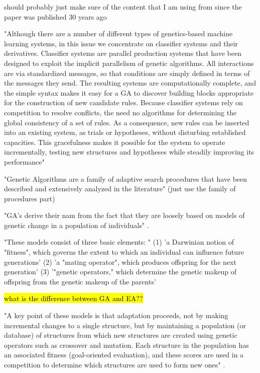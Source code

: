 should probably just make sure of the content that I am using from \cite{goldberg1988genetic} since the paper was published 30 years ago

"Although there are a number of different types of genetics-based machine learning systems, in this issue we concentrate on classifier systems and their derivatives. Classifier systems are parallel production systems that have been designed to exploit the implicit parallelism of genetic algorithms. All interactions are via standardized messages, so that conditions are simply defined in terms of the messages they send. The resulting systems are computationally complete, and the simple syntax makes it easy for a GA to discover building blocks appropriate for the construction of new candidate rules. Because classifier systems rely on competition to resolve conflicts, the need no algorithms for determining the global consistency of a set of rules. As a consequence, new rules can be inserted into an existing system, as trials or hypotheses, without disturbing established capacities. This gracefulness makes it possible for the system to operate incrementally, testing new structures and hypotheses while steadily improving its performance"


"Genetic Algorithms are a family of adaptive search procedures that have been described and extensively analyzed in the literature" \cite{de1988learning} (just use the family of procedures part)

"GA's derive their nam from the fact that they are loosely based on models of genetic change in a population of individuals" \cite{de1988learning}.

"These models consist of three basic elements: " \cite{de1988learning}
(1) 'a Darwinian notion of "fitness", which governs the extent to which an individual can influence future generations'
(2) 'a "mating operator", which produces offspring for the next generation'
(3) '"genetic operators," which determine the genetic makeup of offspring from the genetic makeup of the parents'

\hl{what is the difference between GA and EA??}

"A key point of these models is that adaptation proceeds, not by making incremental changes to a single structure, but by maintaining a population (or database) of structures from which new structures are created using genetic operators such as crossover and mutation. Each structure in the population has an associated fitness (goal-oriented evaluation), and these scores are used in a competition to determine which structures are used to form new ones" \cite{de1988learning}.


